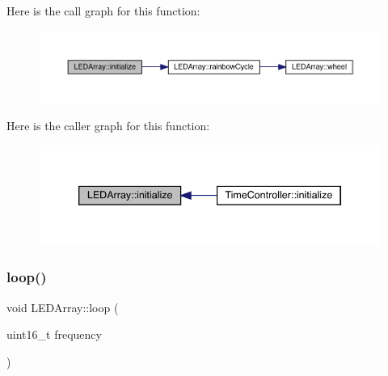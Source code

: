 Here is the call graph for this function\+:
\nopagebreak
\begin{figure}[H]
\begin{center}
\leavevmode
\includegraphics[width=350pt]{class_l_e_d_array_affcc24a132375e42e76f231da3744542_cgraph}
\end{center}
\end{figure}
Here is the caller graph for this function\+:
\nopagebreak
\begin{figure}[H]
\begin{center}
\leavevmode
\includegraphics[width=339pt]{class_l_e_d_array_affcc24a132375e42e76f231da3744542_icgraph}
\end{center}
\end{figure}
\mbox{\label{class_l_e_d_array_a13f7dd3ae81862c31331199c732f8a3e}} 
\subsubsection{\texorpdfstring{loop()}{loop()}}
{\footnotesize\ttfamily void L\+E\+D\+Array\+::loop (\begin{DoxyParamCaption}\item[{uint16\+\_\+t}]{frequency }\end{DoxyParamCaption})}

